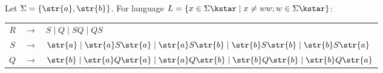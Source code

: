 Let $\Sigma = \{\str{a}, \str{b}\}$. For language $L = \{ x \in \Sigma\kstar \mid x \neq ww; w \in \Sigma\kstar\}$: \par
\begin{tabular}{ccl}
	$R$ & $\rightarrow$ & $S \mid Q \mid SQ \mid QS$ \\
	$S$ & $\rightarrow$ & $\str{a} \mid \str{a}S\str{a} \mid \str{a}S\str{b} \mid \str{b}S\str{b} \mid \str{b}S\str{a}$ \\
	$Q$ & $\rightarrow$ & $\str{b} \mid \str{a}Q\str{a} \mid \str{a}Q\str{b} \mid \str{b}Q\str{b} \mid \str{b}Q\str{a}$ \\
\end{tabular}